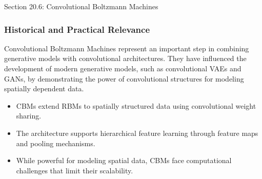 \begin{notes}{Section 20.6: Convolutional Boltzmann Machines}
    \subsubsection*{Historical and Practical Relevance}
    
    Convolutional Boltzmann Machines represent an important step in combining generative models with convolutional architectures. They have influenced the development of modern generative models, such as convolutional VAEs and GANs, by demonstrating the power of convolutional structures for modeling spatially dependent data.
    
    \begin{highlight}
        \begin{itemize}
            \item CBMs extend RBMs to spatially structured data using convolutional weight sharing.
            \item The architecture supports hierarchical feature learning through feature maps and pooling mechanisms.
            \item While powerful for modeling spatial data, CBMs face computational challenges that limit their scalability.
        \end{itemize}
    \end{highlight}
\end{notes}